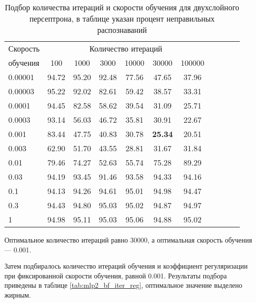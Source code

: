 \begin{table}[h]
	\centering
	\caption{Подбор количества итераций и скорости обучения для двухслойного персептрона, в таблице указан процент неправильных распознаваний}
	\label{tab:mlp2_bf_iter_pace}
	\begin{tabular}{| l | c | c | c | c | c | c | c | c | c | c |}
		\hline
		Скорость & \multicolumn{6}{c|}{Количество итераций} \\
		\hhline{~----------}
		обучения \phantom{00} & \phantom{00} 100 \phantom{00} & \phantom{0} 1000 \phantom{0} & \phantom{0} 3000 \phantom{0} & \phantom{0} 10000 \phantom{0} & \phantom{0} 30000 \phantom{0} & \phantom{0} 100000 \phantom{0} \\
		\hline
		0.00001  & 94.72 & 95.20 & 92.48 & 77.56 & 47.65 & 37.96 \\
		0.00003  & 95.22 & 92.02 & 82.61 & 59.42 & 38.57 & 33.31 \\
		0.0001 	 & 94.45 & 82.58 & 58.62 & 39.54 & 31.09 & 25.71 \\
		0.0003	 & 93.14 & 56.03 & 46.72 & 35.81 & 30.91 & 22.67 \\
		0.001	 & 83.44 & 47.75 & 40.83 & 30.78 & \textbf{25.34} & 20.51 \\
		0.003	 & 62.90 & 51.70 & 43.55 & 28.81 & 31.67 & 31.84 \\
		0.01	 & 79.46 & 74.27 & 52.63 & 55.74 & 75.28 & 89.29 \\
		0.03	 & 94.19 & 93.45 & 91.46 & 93.58 & 94.33 & 94.16 \\
		0.1		 & 94.13 & 94.26 & 94.61 & 95.01 & 94.98 & 94.47 \\
		0.3		 & 94.43 & 94.80 & 95.03 & 95.02 & 94.87 & 94.97 \\
		1		 & 94.98 & 95.11 & 95.03 & 95.06 & 94.88 & 95.02 \\
		\hline
	\end{tabular}
\end{table}

Оптимальное количество итераций равно 30000, а оптимальная скорость обучения --- 0.001.

Затем подбиралось количество итераций обучения и коэффициент регуляризации при фиксированной скорости обучения, равной 0.001.
Результаты подбора приведены в таблице \ref{tab:mlp2_bf_iter_reg}, оптимальное значение выделено жирным.

